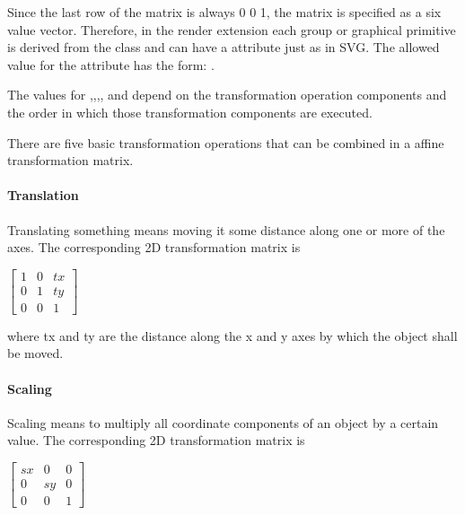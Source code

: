 Since the last row of the matrix is always 0 0 1, the matrix is specified as a 
six value vector. Therefore, in the render extension each group or graphical 
primitive is derived from the class \TransformationTwoD and can have a  attribute just as in SVG. The allowed 
value for the attribute has the form: .

The values for ,,,, and  depend on the transformation operation components and the order in which those transformation components are executed.

There are five basic transformation operations that can be combined in a affine transformation matrix. 

\paragraph{Translation}
Translating something means moving it some distance along one or more of the axes. The corresponding 2D transformation matrix is

\hspace*{0.4cm}
\begin{center}
\begin{math}\left[ \begin{array}{ccc} 1 & 0 & tx \\ 0 & 1 & ty \\ 0 & 0 & 1\end{array}\right]\end{math}
\end{center}
\hspace*{0.4cm}

where tx and ty are the distance along the x and y axes by which the object shall be moved.

\paragraph{Scaling}
Scaling means to multiply all coordinate components of an object by a certain value.
The corresponding 2D transformation matrix is

\hspace*{0.4cm}
\begin{center}
\begin{math}\left[ \begin{array}{ccc} sx & 0 & 0 \\ 0 & sy & 0 \\ 0 & 0 & 1\end{array}\right]\end{math}
\end{center}
\hspace*{0.4cm}

